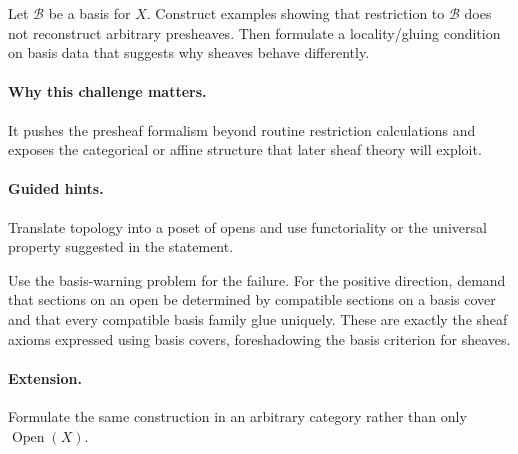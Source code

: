 \begin{problem}
Let $\mathcal B$ be a basis for $X$.  Construct examples showing that restriction to $\mathcal B$ does not reconstruct arbitrary presheaves.  Then formulate a locality/gluing condition on basis data that suggests why sheaves behave differently.
\end{problem}

\paragraph{Why this challenge matters.}
It pushes the presheaf formalism beyond routine restriction calculations and exposes the
categorical or affine structure that later sheaf theory will exploit.

\paragraph{Guided hints.}
Translate topology into a poset of opens and use functoriality or the universal property
suggested in the statement.

\begin{solution}
Use the basis-warning problem for the failure.  For the positive direction, demand that sections on an open be determined by compatible sections on a basis cover and that every compatible basis family glue uniquely.  These are exactly the sheaf axioms expressed using basis covers, foreshadowing the basis criterion for sheaves.
\end{solution}

\paragraph{Extension.}
Formulate the same construction in an arbitrary category rather than only
$\operatorname{Open}(X)$.
